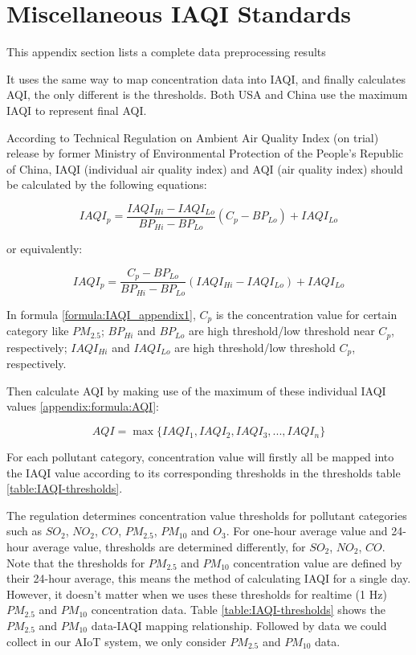 \appendix

\chapter{Miscellaneous IAQI Standards}\label{chapter:IAQI_standards}

This appendix section lists a complete data preprocessing results

It uses the same way to map concentration data into IAQI, and finally calculates AQI, the only different is the thresholds. Both USA and China use the maximum IAQI to represent final AQI.

According to Technical Regulation on Ambient Air Quality Index (on trial) \cite{regulation2012} release by former Ministry of Environmental Protection of the People's Republic of China, IAQI (individual air quality index) and AQI (air quality index) should be calculated by the following equations:

\begin{equation}
    IAQI_p = \frac{IAQI_{Hi}-IAQI_{Lo}}{BP_{Hi}-BP_{Lo}}(C_p-BP_{Lo})+IAQI_{Lo}
\end{equation}

or equivalently:

\begin{equation}
    \label{formula:IAQI_appendix1}
    IAQI_p = \frac{C_p-BP_{Lo}}{BP_{Hi}-BP_{Lo}}(IAQI_{Hi}-IAQI_{Lo})+IAQI_{Lo}
\end{equation}

In formula \ref{formula:IAQI_appendix1}, $C_p$ is the concentration value for certain category like $PM_{2.5}$; $BP_{Hi}$ and $BP_{Lo}$ are high threshold/low threshold near $C_p$, respectively; $IAQI_{Hi}$ and $IAQI_{Lo}$ are high threshold/low threshold $C_p$, respectively.

Then calculate AQI by making use of the maximum of these individual IAQI values \ref{appendix:formula:AQI}:

\begin{equation}
    \label{appendix:formula:AQI}
    AQI = \max\{IAQI_1,IAQI_2,IAQI_3,...,IAQI_n\}
\end{equation}

For each pollutant category, concentration value will firstly all be mapped into the IAQI value according to its corresponding thresholds in the thresholds table \ref{table:IAQI-thresholds}.

The regulation \cite{regulation2012} determines concentration value thresholds for pollutant categories such as $SO_2$, $NO_2$, $CO$, $PM_{2.5}$, $PM_{10}$ and $O_3$. For one-hour average value and 24-hour average value, thresholds are determined differently, for $SO_2$, $NO_2$, $CO$. Note that the thresholds for $PM_{2.5}$ and $PM_{10}$ concentration value are defined by their 24-hour average, this means the method of calculating IAQI for a single day. However, it doesn't matter when we uses these thresholds for realtime (1 Hz) $PM_{2.5}$ and $PM_{10}$ concentration data. Table \ref{table:IAQI-thresholds} shows the $PM_{2.5}$ and $PM_{10}$ data-IAQI mapping relationship. Followed by data we could collect in our AIoT system, we only consider $PM_{2.5}$ and $PM_{10}$ data.

